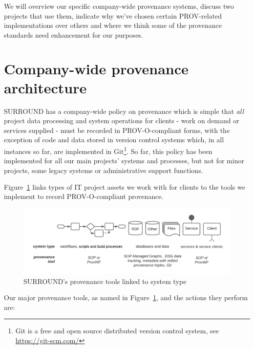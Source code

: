 \documentclass[letterpaper,twocolumn,10pt]{article}
\begin{document}
We will overview our specific company-wide provenance systems, discuss two projects that use them, indicate 
why we've chosen certain PROV-related implementations over others and where we think some of the provenance
standards need enhancement for our purposes.

\section{Company-wide provenance architecture}
SURROUND has a company-wide policy on provenance which is simple that \textit{all} project data processing 
and system operations for clients - work on demand or services supplied - must be recorded in 
PROV-O-compliant forms, with the exception of code and data stored in version control systems which, in all 
instances so far, are implemented in Git\footnote{Git is a free and open source distributed version control 
system, see \url{https://git-scm.com/}}. So far, this policy has been implemented for all our main projects' 
systems and processes, but not for minor projects, some legacy systems or administrative support functions.

Figure~\ref{fig:overview} links types of IT project assets we work with for clients to the tools we implement
to record PROV-O-compliant provenance. 

\begin{figure}
  \begin{center}
    \includegraphics[width=\textwidth]{images/overview.png}
  \end{center}
  \caption{\label{fig:overview} SURROUND's provenance tools linked to system type}
  \end{figure}

Our major provenance tools, as named in Figure~\ref{fig:overview}, and the actions they perform are:
\end{document}
